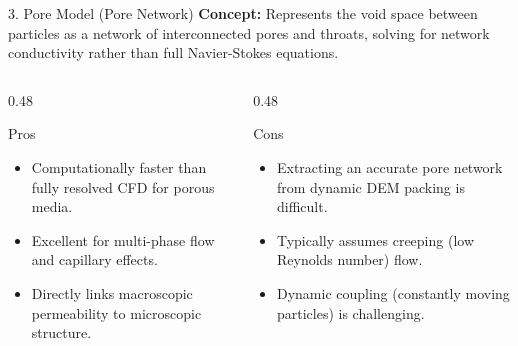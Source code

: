 \begin{frame}{3. Pore Model (Pore Network)}
    \textbf{Concept:} Represents the void space between particles as a network of interconnected pores and throats, solving for network conductivity rather than full Navier-Stokes equations.
    \vspace{0.3cm}
    
    \begin{columns}[T]
        \begin{column}{0.48\textwidth}
            \begin{block}{Pros}
                \begin{itemize}
                    \item Computationally faster than fully resolved CFD for porous media.
                    \item Excellent for multi-phase flow and capillary effects.
                    \item Directly links macroscopic permeability to microscopic structure.
                \end{itemize}
            \end{block}
        \end{column}
        
        \begin{column}{0.48\textwidth}
            \begin{alertblock}{Cons}
                \begin{itemize}
                    \item Extracting an accurate pore network from dynamic DEM packing is difficult.
                    \item Typically assumes creeping (low Reynolds number) flow.
                    \item Dynamic coupling (constantly moving particles) is challenging.
                \end{itemize}
            \end{alertblock}
        \end{column}
    \end{columns}
\end{frame}

